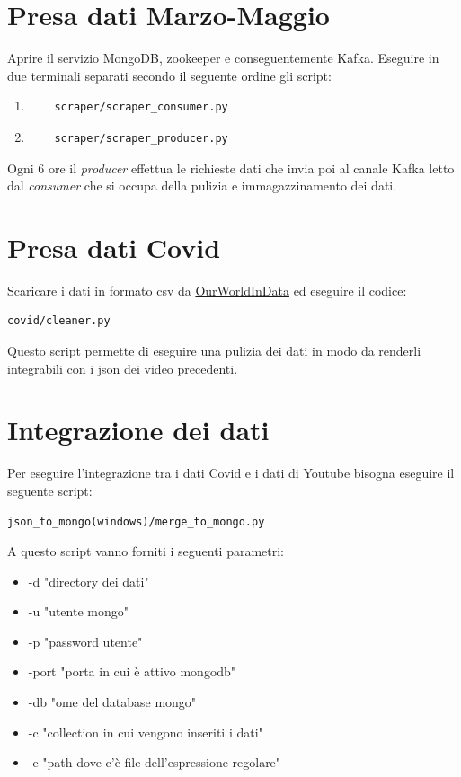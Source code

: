 \documentclass[10pt, a4paper,openany]{article}
\begin{document}
\section*{Presa dati Marzo-Maggio}

Aprire il servizio MongoDB, zookeeper e conseguentemente Kafka. Eseguire in due terminali separati secondo il seguente ordine gli script:

\begin{enumerate}
	\item \begin{verbatim}
	scraper/scraper_consumer.py
	\end{verbatim}
	\item \begin{verbatim}
	scraper/scraper_producer.py
	\end{verbatim}
\end{enumerate}

Ogni 6 ore il \textit{producer} effettua le richieste dati che invia poi al canale Kafka letto dal \textit{consumer} che si occupa della pulizia e immagazzinamento dei dati.

\section*{Presa dati Covid}

Scaricare i dati in formato csv da \href{https://ourworldindata.org/coronavirus-testing}{OurWorldInData}
ed eseguire il codice:

\begin{verbatim}
covid/cleaner.py
\end{verbatim}

Questo script permette di eseguire una pulizia dei dati in modo da renderli integrabili con i json dei video precedenti.

\section*{Integrazione dei dati}


Per eseguire l'integrazione tra i dati Covid e i dati di Youtube bisogna eseguire il seguente script:

\begin{verbatim}
json_to_mongo(windows)/merge_to_mongo.py
\end{verbatim}

A questo script vanno forniti i seguenti parametri:

\begin{itemize}
	\item -d "directory dei dati"
	\item -u "utente mongo"
	\item -p "password utente"
	\item -port "porta in cui è attivo mongodb"
	\item-db "ome del database mongo"
	\item -c "collection in cui vengono inseriti i dati"
	\item -e "path dove c'è file dell'espressione regolare"
\end{itemize}
\end{document}
